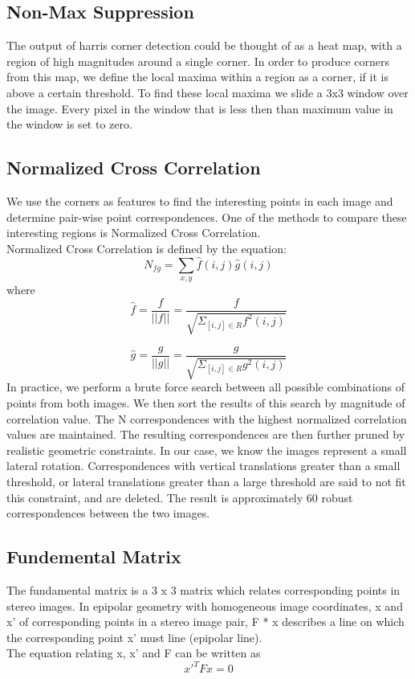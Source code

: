 \documentclass[letterpaper,11pt]{article}
\begin{document}
\subsection{Non-Max Suppression}
The output of harris corner detection could be thought of as a heat
map, with a region of high magnitudes around a single corner. In order
to produce corners from this map, we define the local maxima within a
region as a corner, if it is above a certain threshold. To find these
local maxima we slide a 3x3 window over the image. Every pixel in the
window that is less then than maximum value in the window is set to
zero.

\subsection{Normalized Cross Correlation}
We use the corners as features to find the interesting points in each
image and determine pair-wise point correspondences. One of the
methods to compare these interesting regions is Normalized Cross Correlation. \\

Normalized Cross Correlation is defined by the equation:
\[
N_{fg}  = \sum\limits_{x,y} \hat{f}(i,j)\hat{g}(i,j)
\]
where
\[
  \hat{f} = \frac{f}{||f||} = \frac{f}{\sqrt{\Sigma_{[i,j] \in R} f^{2}(i,j)}}
  \]

\[
  \hat{g} = \frac{g}{||g||} = \frac{g}{\sqrt{\Sigma_{[i,j] \in R} g^{2}(i,j)}}
  \]
  In practice, we perform a brute force search between all possible
  combinations of points from both images. We then sort the results of
  this search by magnitude of correlation value. The N correspondences
  with the highest normalized correlation values are maintained. The
  resulting correspondences are then further pruned by realistic
  geometric constraints. In our case, we know the images represent a
  small lateral rotation. Correspondences with vertical translations
  greater than a small threshold, or lateral translations greater than
  a large threshold are said to not fit this constraint, and are
  deleted. The result is approximately 60 robust correspondences
  between the two images.
  
  \subsection{Fundemental Matrix}
  The fundamental matrix is a 3 x 3 matrix which relates corresponding points in stereo images. In epipolar geometry
  with homogeneous image coordinates, x and x' of corresponding points in a stereo image pair, F * x describes a line
  on which the corresponding point x' must line (epipolar line). \\
  The equation relating x, x' and F can be written as
\[
  x'^{T} F x = 0
  \]
\end{document}
